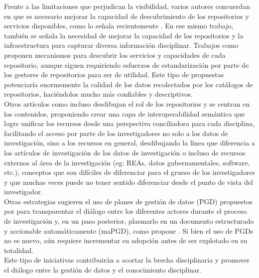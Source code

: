 \documentclass[runningheads]{llncs}
\begin{document}
Frente a las limitaciones que perjudican la visibilidad, varios autores concuerdan en que es necesario mejorar la capacidad de descubrimiento de los repositorios y servicios disponibles, como lo señala recientemente \citet{Huber2024FAIR}. En ese mismo trabajo, también se señala la necesidad de mejorar la capacidad de los repositorios y la infraestructura para capturar diversa información disciplinar. Trabajos como \citet{ulrich_2024_10847707} proponen mecanismos para descubrir los servicios y capacidades de cada repositorio, aunque siguen requiriendo esfuerzos de estandarización por parte de los gestores de repositorios para ser de utilidad. Este tipo de propuestas potenciaría enormemente la calidad de los datos recolectados por los catálogos de repositorios, haciéndolos mucho más confiables y descriptivos.\\

Otros artículos como \citet{Vogt_2025} incluso desdibujan el rol de los repositorios y se centran en los contenidos, proponiendo crear una capa de interoperabilidad semántica que logre unificar los recursos desde una perspectiva conciliadora para cada disciplina, facilitando el  acceso por parte de los investigadores no solo a los datos de investigación, sino a los recursos en general, desdibujando la línea que diferencia a los artículos de investigación de los datos de investigación o incluso de recursos externos al área de la investigación (eg: REAs, datos gubernamentales, software, etc.), conceptos que son difíciles de diferenciar para el grueso de los investigadores y que muchas veces puede no tener sentido diferenciar desde el punto de vista del investigador.\\

Otras estrategias sugieren el uso de planes de gestión de datos (PGD) propuestos por \citet{bicarregui2012dmp} para transparentar el diálogo entre los diferentes actores durante el proceso de investigación y, en un paso posterior, plasmarlo en un documento estructurado y accionable automáticamente (maPGD), como propone \citet{simms2019_madmp}. Si bien el uso de PGDs no es nuevo, aún requiere incrementar su adopción antes de ser explotado en su totalidad.\\

Este tipo de iniciativas contribuirán a acortar la brecha disciplinaria y promover el diálogo entre la gestión de datos y el conocimiento disciplinar.\\




\end{document}
